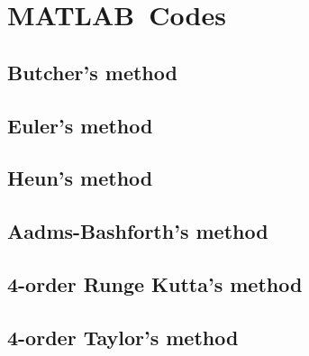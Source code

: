 \chapter{MATLAB\texttrademark\ Codes}

\section{Butcher's method\label{butcher}}


\section{Euler's method\label{euler}}


\section{Heun's method\label{heun}}


\section{Aadms-Bashforth's method\label{ab2}}


\section{4-order Runge Kutta's method\label{rk4}}


\section{4-order Taylor's method\label{taylor}}
